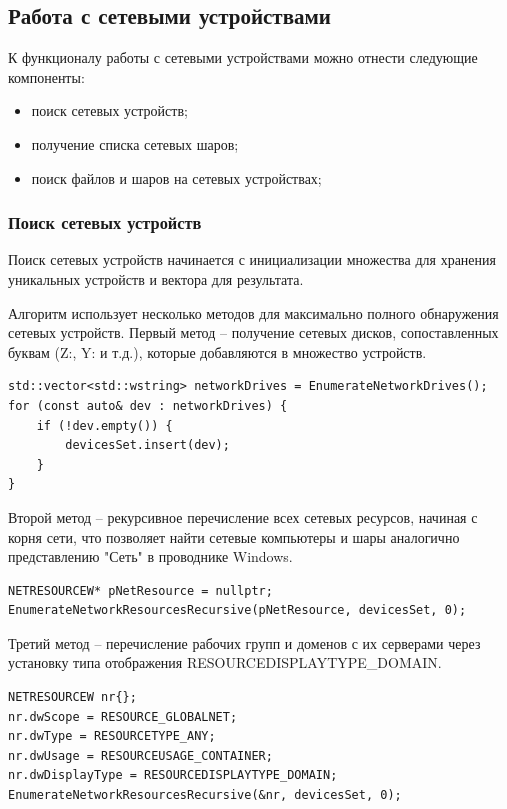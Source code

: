 \subsection{Работа с сетевыми устройствами}

К функционалу работы с сетевыми устройствами можно отнести следующие компоненты:

\begin{itemize}
    \item поиск сетевых устройств;
    \item получение списка сетевых шаров;
    \item поиск файлов и шаров на сетевых устройствах;
\end{itemize}

\subsubsection{Поиск сетевых устройств}

Поиск сетевых устройств начинается с инициализации множества для хранения уникальных устройств и вектора для результата.

Алгоритм использует несколько методов для максимально полного обнаружения сетевых устройств. Первый метод -- получение сетевых дисков, сопоставленных буквам (Z:, Y: и т.д.), которые добавляются в множество устройств.

\begin{lstlisting}[style=CodeListing]
std::vector<std::wstring> networkDrives = EnumerateNetworkDrives();
for (const auto& dev : networkDrives) {
    if (!dev.empty()) {
        devicesSet.insert(dev);
    }
}
\end{lstlisting}

Второй метод -- рекурсивное перечисление всех сетевых ресурсов, начиная с корня сети, что позволяет найти сетевые компьютеры и шары аналогично представлению "Сеть" в проводнике Windows.

\begin{lstlisting}[style=CodeListing]
NETRESOURCEW* pNetResource = nullptr;
EnumerateNetworkResourcesRecursive(pNetResource, devicesSet, 0);
\end{lstlisting}

Третий метод -- перечисление рабочих групп и доменов с их серверами через установку типа отображения RESOURCEDISPLAYTYPE\_DOMAIN.

\begin{lstlisting}[style=CodeListing]
NETRESOURCEW nr{};
nr.dwScope = RESOURCE_GLOBALNET;
nr.dwType = RESOURCETYPE_ANY;
nr.dwUsage = RESOURCEUSAGE_CONTAINER;
nr.dwDisplayType = RESOURCEDISPLAYTYPE_DOMAIN;
EnumerateNetworkResourcesRecursive(&nr, devicesSet, 0);
\end{lstlisting}

